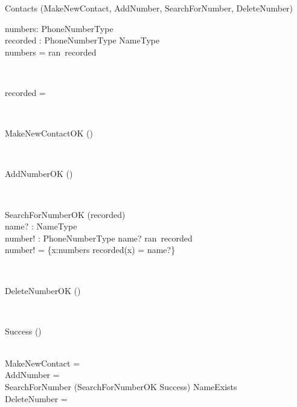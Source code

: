 \begin{class}{Contacts}
\also
\upharpoonright (MakeNewContact, AddNumber, SearchForNumber, DeleteNumber) \\
\begin{state}
numbers:  PhoneNumberType\\
recorded : PhoneNumberType \rightarrow NameType\\
\where
numbers = ran~recorded
\end{state} \\
\begin{init}
recorded = \emptyset %
\end{init} \\
\begin{op}{MakeNewContactOK}
\Delta () \\
\ST
\end{op}\\
\begin{op}{AddNumberOK}
\Delta () \\
\ST
\end{op}\\
\begin{op}{SearchForNumberOK}
    \Xi (recorded) \\
    name? : NameType\\
    number! :  PhoneNumberType
    \ST
    name? \in ran~recorded\\
    number! = \{x:numbers  \mid recorded(x) = name?\}
\end{op}\\
\begin{op}{DeleteNumberOK}
\Delta () \\
\ST
\end{op}\\
\begin{op}{Success}
\Delta () \\
\ST
\end{op}\\ %
\also
MakeNewContact =\\
AddNumber = \\
SearchForNumber \sdef (SearchForNumberOK \wedge Success) \vee \neg NameExists \\
DeleteNumber =
\end{class}